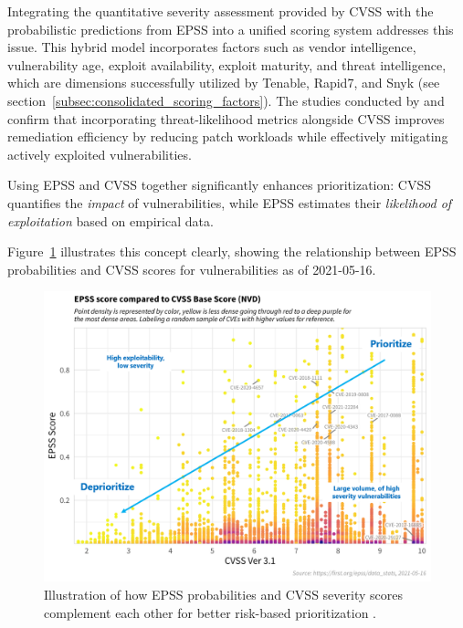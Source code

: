 Integrating the quantitative severity assessment provided by \ac{CVSS} with the probabilistic predictions from \ac{EPSS} into a unified scoring system addresses this issue. This hybrid model incorporates factors such as vendor intelligence, vulnerability age, exploit availability, exploit maturity, and threat intelligence, which are dimensions successfully utilized by Tenable, Rapid7, and Snyk (see section~\ref{subsec:consolidated_scoring_factors}). The studies conducted by \textcite{jacobs_exploit_2021} and \textcite{first_epss_2021} confirm that incorporating threat-likelihood metrics alongside \ac{CVSS} improves remediation efficiency by reducing patch workloads while effectively mitigating actively exploited vulnerabilities.

Using \ac{EPSS} and \ac{CVSS} together significantly enhances prioritization: \ac{CVSS} quantifies the \emph{impact} of vulnerabilities, while \ac{EPSS} estimates their \emph{likelihood of exploitation} based on empirical data.

Figure~\ref{fig:epss_cvss_compare} illustrates this concept clearly, showing the relationship between \ac{EPSS} probabilities and \ac{CVSS} scores for vulnerabilities as of 2021-05-16.

\begin{figure}[H]
	\centering
	\includegraphics[scale=0.46]{resources/EPSS_CVSS_Compare.png}
	\caption[\ac{EPSS} and \ac{CVSS} Comparison]{Illustration of how \ac{EPSS} probabilities and \ac{CVSS} severity scores complement each other for better risk-based prioritization \autocite{first_epss_2021}.}
	\label{fig:epss_cvss_compare}
\end{figure}

